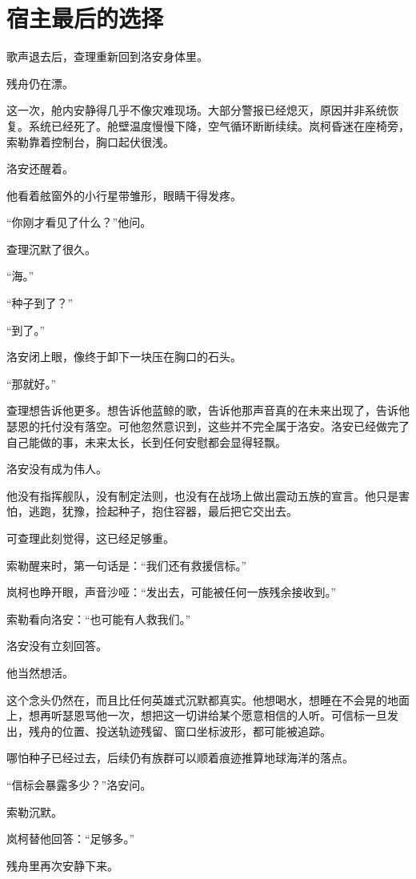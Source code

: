 \chapter{宿主最后的选择}

歌声退去后，查理重新回到洛安身体里。

残舟仍在漂。

这一次，舱内安静得几乎不像灾难现场。大部分警报已经熄灭，原因并非系统恢复。系统已经死了。舱壁温度慢慢下降，空气循环断断续续。岚柯昏迷在座椅旁，索勒靠着控制台，胸口起伏很浅。

洛安还醒着。

他看着舷窗外的小行星带雏形，眼睛干得发疼。

“你刚才看见了什么？”他问。

查理沉默了很久。

“海。”

“种子到了？”

“到了。”

洛安闭上眼，像终于卸下一块压在胸口的石头。

“那就好。”

查理想告诉他更多。想告诉他蓝鲸的歌，告诉他那声音真的在未来出现了，告诉他瑟恩的托付没有落空。可他忽然意识到，这些并不完全属于洛安。洛安已经做完了自己能做的事，未来太长，长到任何安慰都会显得轻飘。

洛安没有成为伟人。

他没有指挥舰队，没有制定法则，也没有在战场上做出震动五族的宣言。他只是害怕，逃跑，犹豫，捡起种子，抱住容器，最后把它交出去。

可查理此刻觉得，这已经足够重。

索勒醒来时，第一句话是：“我们还有救援信标。”

岚柯也睁开眼，声音沙哑：“发出去，可能被任何一族残余接收到。”

索勒看向洛安：“也可能有人救我们。”

洛安没有立刻回答。

他当然想活。

这个念头仍然在，而且比任何英雄式沉默都真实。他想喝水，想睡在不会晃的地面上，想再听瑟恩骂他一次，想把这一切讲给某个愿意相信的人听。可信标一旦发出，残舟的位置、投送轨迹残留、窗口坐标波形，都可能被追踪。

哪怕种子已经过去，后续仍有族群可以顺着痕迹推算地球海洋的落点。

“信标会暴露多少？”洛安问。

索勒沉默。

岚柯替他回答：“足够多。”

残舟里再次安静下来。

